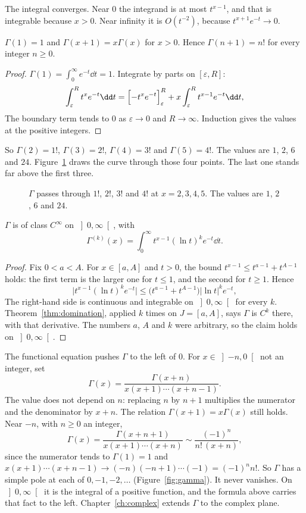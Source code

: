 The integral converges. Near $0$ the integrand is at most $t^{x-1}$, and that is integrable because $x>0$. Near infinity it is $O(t^{-2})$, because $t^{x+1}e^{-t}\to0$.

\begin{proposition}\label{prop:gammafe}
$\Gamma(1)=1$ and $\Gamma(x+1)=x\Gamma(x)$ for $x>0$. Hence $\Gamma(n+1)=n!$ for every integer $n\ge0$.
\end{proposition}
\begin{proof}
$\Gamma(1)=\int_0^\infty e^{-t}\dd t=1$. Integrate by parts on $[\varepsilon,R]$:
\[
\int_\varepsilon^Rt^xe^{-t}\dd t=\Bigl[-t^xe^{-t}\Bigr]_\varepsilon^R+x\int_\varepsilon^Rt^{x-1}e^{-t}\dd t,
\]
The boundary term tends to $0$ as $\varepsilon\to0$ and $R\to\infty$. Induction gives the values at the positive integers.
\end{proof}

So $\Gamma(2)=1!$, $\Gamma(3)=2!$, $\Gamma(4)=3!$ and $\Gamma(5)=4!$. The values are $1$, $2$, $6$ and $24$. Figure~\ref{fig:rw05-factorials} draws the curve through those four points. The last one stands far above the first three.

\begin{figure}[ht]
\centering
{}
\caption{$\Gamma$ passes through $1!$, $2!$, $3!$ and $4!$ at $x=2,3,4,5$. The values are $1$, $2$, $6$ and $24$.}
\label{fig:rw05-factorials}
\end{figure}

\begin{proposition}\label{prop:gammasmooth}
$\Gamma$ is of class $C^\infty$ on $\left]0,\infty\right[$, with
\[
\Gamma^{(k)}(x)=\int_0^\infty t^{x-1}(\ln t)^ke^{-t}\dd t.
\]
\end{proposition}
\begin{proof}
Fix $0<a<A$. For $x\in[a,A]$ and $t>0$, the bound $t^{x-1}\le t^{a-1}+t^{A-1}$ holds: the first term is the larger one for $t\le1$, and the second for $t\ge1$. Hence
\[
\bigl|t^{x-1}(\ln t)^ke^{-t}\bigr|\le\bigl(t^{a-1}+t^{A-1}\bigr)|\ln t|^ke^{-t},
\]
The right-hand side is continuous and integrable on $\left]0,\infty\right[$ for every $k$. Theorem~\ref{thm:domination}, applied $k$ times on $J=[a,A]$, says $\Gamma$ is $C^k$ there, with that derivative. The numbers $a$, $A$ and $k$ were arbitrary, so the claim holds on $\left]0,\infty\right[$.
\end{proof}

The functional equation pushes $\Gamma$ to the left of $0$. For $x\in\left]-n,0\right[$ not an integer, set
\[
\Gamma(x)=\frac{\Gamma(x+n)}{x(x+1)\cdots(x+n-1)}.
\]
The value does not depend on $n$: replacing $n$ by $n+1$ multiplies the numerator and the denominator by $x+n$. The relation
$\Gamma(x+1)=x\Gamma(x)$ still holds. Near $-n$, with $n\ge0$ an integer,
\[
\Gamma(x)=\frac{\Gamma(x+n+1)}{x(x+1)\cdots(x+n)}\sim\frac{(-1)^n}{n!\,(x+n)},
\]
since the numerator tends to $\Gamma(1)=1$ and $x(x+1)\cdots(x+n-1)\to(-n)(-n+1)\cdots(-1)=(-1)^nn!$. So $\Gamma$ has a
simple pole at each of $0,-1,-2,\dots$ (Figure~\ref{fig:gamma}). It never vanishes. On $\left]0,\infty\right[$ it is the integral of a
positive function, and the formula above carries that fact to the left. Chapter~\ref{ch:complex} extends $\Gamma$ to the complex plane.

